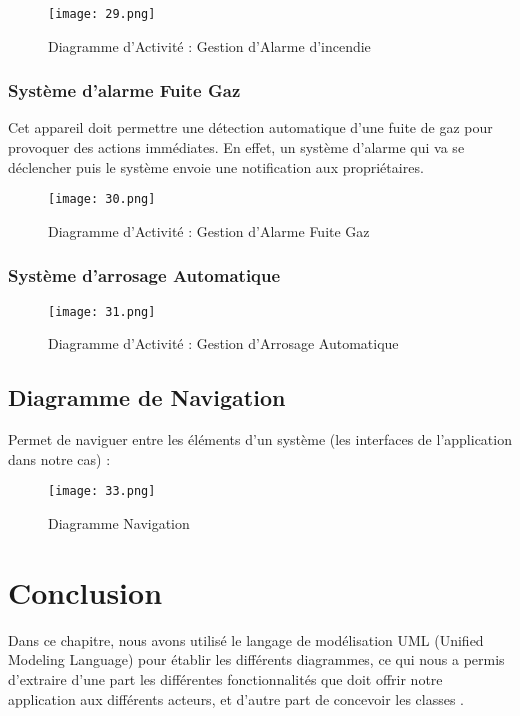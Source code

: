 \begin{spacing}{1.2}
\begin{figure}[H]\centering
\texttt{[image: 29.png]}
\caption{Diagramme d'Activité : Gestion d'Alarme d'incendie}
\label{fig:fig3}
\end{figure} 

\newpage
 
\subsubsection{Système d’alarme Fuite Gaz}
Cet appareil doit permettre une détection automatique d’une fuite de gaz pour provoquer des actions immédiates.
En effet, un système d’alarme qui va se déclencher puis le système envoie une notification aux propriétaires.
\begin{figure}[H]\centering
\texttt{[image: 30.png]}
\caption{Diagramme d'Activité : Gestion d'Alarme Fuite Gaz}
\label{fig:fig3}
\end{figure} 

\subsubsection{Système d’arrosage Automatique}
\begin{figure}[H]\centering
\texttt{[image: 31.png]}
\caption{Diagramme d'Activité : Gestion d'Arrosage Automatique}
\label{fig:fig3}
\end{figure} 

\newpage

\subsection{Diagramme de Navigation}
 Permet de naviguer entre les éléments d’un système (les interfaces de l’application dans notre cas) :
 
 \begin{figure}[H]\centering
\texttt{[image: 33.png]}
\caption{Diagramme Navigation}
\label{fig:fig3}
\end{figure} 

 
\section*{Conclusion}
Dans ce chapitre, nous avons utilisé le langage de modélisation UML (Unified Modeling Language) pour établir les différents diagrammes, ce qui nous a permis d’extraire d’une part les différentes fonctionnalités que doit offrir notre application aux différents acteurs, et d’autre part de concevoir les classes .





\end{spacing}
